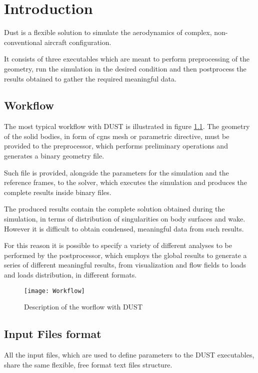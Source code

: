\chapter{Introduction}

Dust is a flexible solution to simulate the aerodynamics of complex, 
non-conventional aircraft configuration.

It consists of three executables which are meant to perform preprocessing 
of the geometry, run the simulation in the desired condition and then postprocess 
the results obtained to gather the required meaningful data. 

\section{Workflow}
\label{sec:Workflow}

The most typical workflow with DUST is illustrated in figure \ref{fig:worflow}.  
The geometry of the solid bodies, in form of cgns mesh or parametric directive, 
must be provided to the preprocessor, which performs preliminary operations and 
generates a binary geometry file. 

Such file is provided, alongside the parameters for the simulation and the reference 
frames, to the solver, which executes the simulation and produces the complete results 
inside binary files. 

The produced results contain the complete solution obtained during the simulation, 
in terms of distribution of singularities on body surfaces and wake. However it is 
difficult to obtain condensed, meaningful data from such results.

For this reason it is possible to specify a variety of different analyses to be 
performed by the postprocessor, which employs the global results to generate a 
series of different meaningful results, from visualization and flow fields to 
loads and loads distribution, in different formats.

\begin{figure}[h]
\centering
\texttt{[image: Workflow]}
\caption{Description of the worflow with DUST}
\label{fig:worflow}
\end{figure}



\section{Input Files format}
\label{sec:InputFilesFormat}
All the input files, which are used to define parameters to the DUST executables, 
share the same flexible, free format text files structure.

